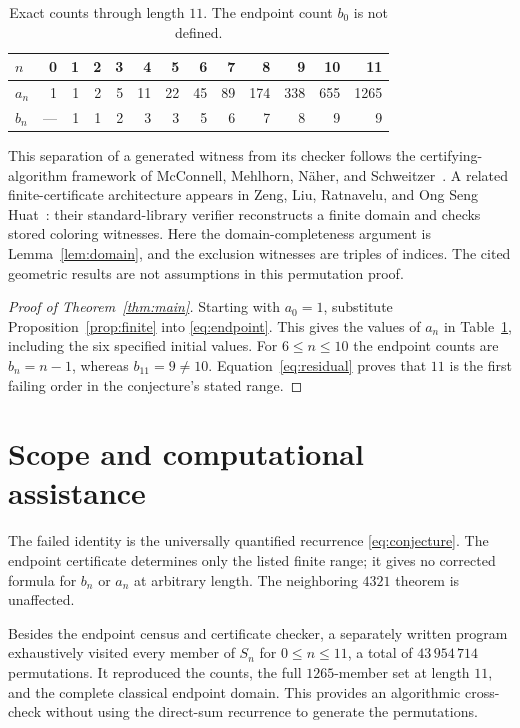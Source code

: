 \documentclass[11pt,a4paper]{article}
\begin{document}
\begin{table}[tbp]
\centering\small
\caption{Exact counts through length $11$. The endpoint count $b_0$ is not defined.}
\label{tab:counts}
\begin{tabular}{@{}lrrrrrrrrrrrr@{}}
\toprule
$n$ & 0 & 1 & 2 & 3 & 4 & 5 & 6 & 7 & 8 & 9 & 10 & 11 \\
\midrule
$a_n$ & 1 & 1 & 2 & 5 & 11 & 22 & 45 & 89 & 174 & 338 & 655 & 1265 \\
$b_n$ & --- & 1 & 1 & 2 & 3 & 3 & 5 & 6 & 7 & 8 & 9 & 9 \\
\bottomrule
\end{tabular}
\end{table}

This separation of a generated witness from its checker follows the
certifying-algorithm framework of McConnell, Mehlhorn, N\"aher, and
Schweitzer~\cite{McConnellEtAl2011}. A related finite-certificate architecture
appears in Zeng, Liu, Ratnavelu, and Ong Seng Huat~\cite{ZengEtAl2026}:
their standard-library verifier reconstructs a finite domain and checks stored
coloring witnesses. Here the domain-completeness argument is
Lemma~\ref{lem:domain}, and the exclusion witnesses are triples of indices.
The cited geometric results are not assumptions in this permutation proof.

\begin{proof}[Proof of Theorem~\ref{thm:main}]
Starting with $a_0=1$, substitute Proposition~\ref{prop:finite} into
\eqref{eq:endpoint}. This gives the values of $a_n$ in Table~\ref{tab:counts},
including the six specified initial values. For $6\leq n\leq10$ the endpoint
counts are $b_n=n-1$, whereas $b_{11}=9\ne10$.
Equation~\eqref{eq:residual} proves that $11$ is the first failing order
in the conjecture's stated range.
\end{proof}

\section{Scope and computational assistance}

The failed identity is the universally quantified recurrence
\eqref{eq:conjecture}. The endpoint certificate determines only the listed
finite range; it gives no corrected formula for $b_n$ or $a_n$ at arbitrary
length. The neighboring $4321$ theorem is unaffected.

Besides the endpoint census and certificate checker, a separately written
program exhaustively visited every member of $S_n$ for $0\leq n\leq11$,
a total of $43\,954\,714$ permutations. It reproduced the counts, the full
$1265$-member set at length $11$, and the complete classical endpoint domain.
This provides an algorithmic cross-check without using the direct-sum
recurrence to generate the permutations.
\end{document}
